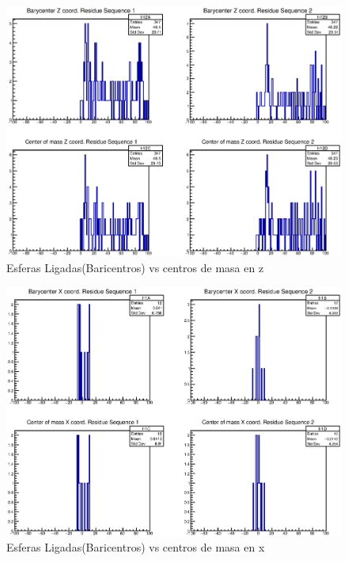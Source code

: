 \begin{figure}[htbp]
    \centering
    \includegraphics[width=1\linewidth]{./Figures/can3.eps}
  \caption[Esferas Ligadas(Baricentros) vs centros de masa en z]{Esferas Ligadas(Baricentros) vs centros de masa en z}
    \label{fig:canz}
\end{figure}




\begin{figure}[htbp]
    \centering
    \includegraphics[width=1\linewidth]{./Figures/1fzx.eps}
    \caption[Esferas Ligadas(Baricentros) vs centros de masa en x]{Esferas Ligadas(Baricentros) vs centros de masa en x} %
    \label{fig:cax}
\end{figure}

